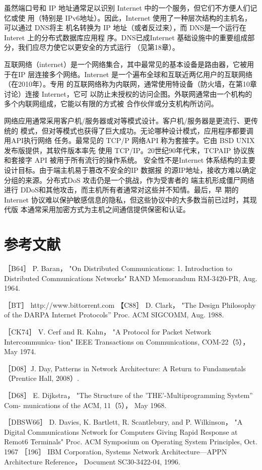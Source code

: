 虽然端口号和 IP 地址通常足以识别 Internet 中的一个服务，但它们不方便人们记忆或使
用（特别是 IPv6地址）。因此，Internet 使用了一种层次结构的主机名，可以通过 DNS将主
机名转换为 IP 地址（或者反过来），而 DNS是一个运行在 Interet 上的分布式数据库应用程
序。DNS已成Internet 基础设施中的重要组成部分，我们应尽力使它以更安全的方式运行
（见第18章）。

互联网络（internet）是一个网络集合，其中最常见的基本设备是路由器，它被用于在IP
层连接多个网络。Internet 是一个遍布全球和互联近两亿用户的互联网络（在2010年）。专用
的互联网络称为内联网，通常使用特设备（防火墙，在第10章讨论）连接 Internet，它可
以防止未授权的访问企图。外联网通常由一个机构的多个内联网组成，它能以有限的方式被
合作伙伴或分支机构所访问。

网络应用通常采用客户机/服务器或对等模式设计。客户机/服务器是更流行、更传统的
模式，但对等模式也获得了巨大成功。无论哪种设计模式，应用程序都要调用API执行网络
任务。最常见的 TCP/P 网络API 称为套接字。它由 BSD UNIX 发布版提供，其软件版本率先
使用 TCP/IP。20世纪90年代末，TCPAIP 协议族和套接字 API 被用于所有流行的操作系统。
安全性不是Internet 体系结构的主要设计目标。由于端主机易于篡改不安全的IP 数据报
的源IP地址，接收方难以确定分组的来源。分布式DoS 攻击仍是一个挑战，作为受害者的
端主机形成僵尸网络进行 DDoS和其他攻击，而主机所有者通常对这些并不知情。最后，早
期的 Internet 协议难以保护敏感信息的隐私，但这些协议中的大多数当前已过时，其现代版
本通常采用加密方式为主机之间通信提供保密和认证。

\section{参考文献}
\iffalse
［B64］ P. Baran， "On Distributed Communications: 1. Introduction to Distributed
Communications Networks" RAND Memorandum RM-3420-PR, Aug. 1964.

［BT］ http://www.bittorrent.com
【C88］ D. Clark，
"The Design Philosophy of the DARPA Internet Protocols” Proc.
ACM SIGCOMM, Aug. 1988.

［CK74］ V. Cerf and R. Kahn， "A Protocol for Packet Network Intercommunica-
tion" IEEE Transactions on Communications, COM-22（5）， May 1974.

［D08］J. Day, Patterns in Network Architecture: A Return to Fundamentals （Prentice
Hall, 2008）.

［D68］ E. Dijkstra， "The Structure of the 'THE'-Multiprogramming System” Com-
munications of the ACM, 11（5）， May 1968.

［DBSW66］ D. Davies, K. Bartlett, R. Scantlebury, and P. Wilkinson， "A Digital
Communications Network for Computers Giving Rapid Response at Remot6
Terminals" Proc. ACM Symposium on Operating System Principles, Oct. 1967
［196］ IBM Corporation, Systems Network Architecture—APPN Architecture Reference，
Document SC30-3422-04, 1996.

